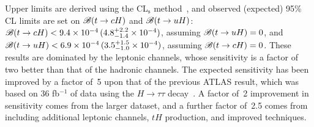 Upper limits are derived using the CL$_{\textrm{s}}$ method~\cite{Junk:1999kv,Read:2002hq}, and  
observed (expected) 95\% CL limits are set on $\mathscr{B}(t\to cH)$ and $\mathscr{B}(t\to uH)$:
$\mathscr{B}(t\to cH)<9.4 \times 10^{-4}\,(4.8^{+2.2}_{-1.4}\times10^{-4})$, assuming $\mathscr{B}(t\to uH)=0$, and $\mathscr{B}(t\to uH)<6.9 \times 10^{-4}\,(3.5^{+1.5}_{-1.0}\times10^{-4})$, assuming $\mathscr{B}(t\to cH)=0$.
These results are dominated by the leptonic channels, whose sensitivity is a factor of two better than that of the hadronic channels.
The expected sensitivity has been improved by a factor of~5 upon that of the previous ATLAS result, which was based on 36 fb$^{-1}$ of data using the $H\to \tau\tau$ decay~\cite{fcnc36}.
A factor of~2 improvement in sensitivity comes from the larger dataset, and a further factor of~2.5 comes from including
additional leptonic channels, $tH$ production, and improved techniques.

